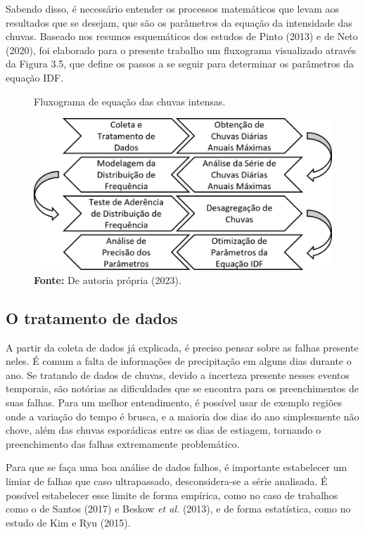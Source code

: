 Sabendo disso, é necessário entender os processos matemáticos que levam aos resultados que se desejam, que são os parâmetros da equação da intensidade das chuvas. Baseado nos resumos esquemáticos dos estudos de Pinto (2013) e de Neto (2020), foi elaborado para o presente trabalho um fluxograma visualizado através da Figura 3.5, que define os passos a se seguir para determinar os parâmetros da equação IDF.\bigskip

\begin{figure}[!ht]
	\centering
	\caption{Fluxograma de equação das chuvas intensas.}
	\includegraphics[width=.7625\linewidth]{figuras/fluxograma_de_equacao_idf.png}
	\caption*{\textbf{Fonte:} De autoria própria (2023).}
	\label{fig:fluxograma_de_equacao_idf.png}
\end{figure}

\subsection{O tratamento de dados}

A partir da coleta de dados já explicada, é preciso pensar sobre as falhas presente neles. É comum a falta de informações de precipitação em alguns dias durante o ano. Se tratando de dados de chuvas, devido a incerteza presente nesses eventos temporais, são notórias as dificuldades que se encontra para os preenchimentos de suas falhas. Para um melhor entendimento, é possível usar de exemplo regiões onde a variação do tempo é brusca, e a maioria dos dias do ano simplesmente não chove, além das chuvas esporádicas entre os dias de estiagem, tornando o preenchimento das falhas extremamente problemático. 

Para que se faça uma boa análise de dados falhos, é importante estabelecer um limiar de falhas que caso ultrapassado, desconsidera-se a série analisada. É possível estabelecer esse limite de forma empírica, como no caso de trabalhos como o de Santos (2017) e Beskow \textit{et al.} (2013), e de forma estatística, como no estudo de Kim e Ryu (2015).

